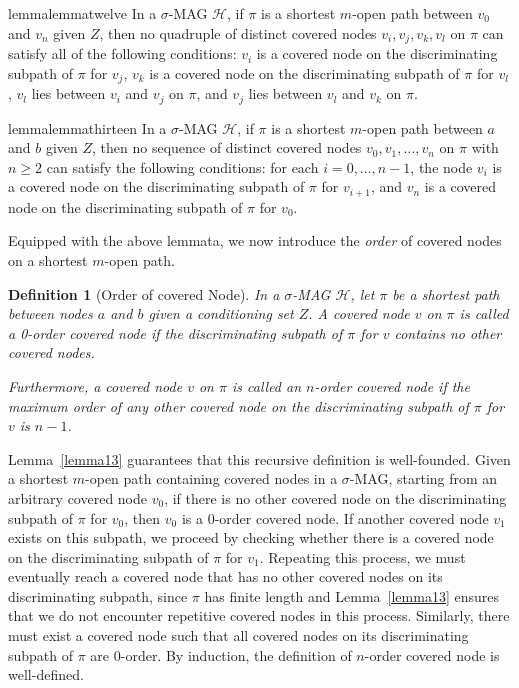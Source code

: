 \documentclass[accepted]{uai2025} %
\newtheorem{definition}{Definition}
\begin{document}
\begin{restatable}{lemma}{lemmatwelve} \label{lemma12}
In a \( \sigma \)-MAG \( \mathcal{H} \), if \( \pi \) is a shortest $m$-open path between \( v_0 \) and \( v_n \) given \( Z \), then no quadruple of distinct covered nodes \( v_i, v_j, v_k, v_l \) on $\pi$ can satisfy all of the following conditions: \( v_i \) is a covered node on the discriminating subpath of \( \pi \) for \( v_j \), \( v_k \) is a covered node on the discriminating subpath of \( \pi \) for \( v_l \), $v_l$ lies between $v_i$ and $v_j$ on $\pi$, and $v_j$ lies between $v_l$ and $v_k$ on $\pi$.
\end{restatable}

\begin{restatable}{lemma}{lemmathirteen} \label{lemma13}
In a \( \sigma \)-MAG \( \mathcal{H} \), if \( \pi \) is a shortest $m$-open path between \( a \) and \( b \) given \( Z \), then no sequence of distinct covered nodes \( v_0, v_1, \ldots, v_n \) on $\pi$ with \( n \geq 2 \) can satisfy the following conditions: for each \( i = 0, \ldots, n-1 \), the node \( v_i \) is a covered node on the discriminating subpath of \( \pi \) for \( v_{i+1} \), and \( v_n \) is a covered node on the discriminating subpath of \( \pi \) for \( v_0 \). 
\end{restatable}

Equipped with the above lemmata, we now introduce the \emph{order} of covered nodes on a shortest $m$-open path.  

\begin{definition} [Order of covered Node] \label{order of covered node}
In a \( \sigma \)-MAG \( \mathcal{H} \), let \( \pi \) be a shortest path between nodes $a$ and $b$ given a conditioning set $Z$. A covered node  \( v \) on \( \pi \) is called a \emph{0-order covered node} if the discriminating subpath of \( \pi \) for \( v \) contains no other covered nodes.  

Furthermore, a covered node \( v \) on \( \pi \) is called an \emph{$n$-order covered node} if the maximum order of any other covered node on the discriminating subpath of \( \pi \) for \( v \) is \( n-1 \).  
\end{definition}

Lemma~\ref{lemma13} guarantees that this recursive definition is well-founded. Given a shortest $m$-open path containing covered nodes in a \( \sigma \)-MAG, starting from an arbitrary covered node \( v_0 \), if there is no other covered node on the discriminating subpath of \( \pi \) for \( v_0 \), then \( v_0 \) is a 0-order covered node. If another covered node \( v_1 \) exists on this subpath, we proceed by checking whether there is a covered node on the discriminating subpath of \( \pi \) for \( v_1 \). Repeating this process, we must eventually reach a covered node that has no other covered nodes on its discriminating subpath, since \( \pi \) has finite length and Lemma~\ref{lemma13} ensures that we do not encounter repetitive covered nodes in this process. Similarly, there must exist a covered node such that all covered nodes on its discriminating subpath of \( \pi \) are 0-order. By induction, the definition of $n$-order covered node is well-defined.
\end{document}
